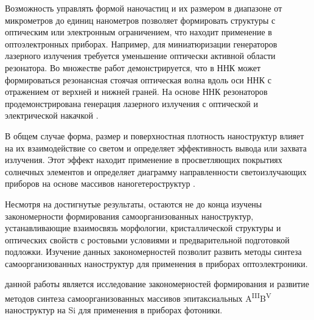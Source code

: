 Возможность управлять формой наночастиц и их размером в диапазоне от
микрометров до единиц нанометров позволяет формировать структуры с оптическим
или электронным ограничением, что находит применение в оптоэлектронных
приборах. Например, для миниатюризации генераторов лазерного излучения
требуется уменьшение оптически активной области резонатора. Во множестве работ
демонстрируется, что в ННК может формироваться резонансная стоячая оптическая
волна вдоль оси ННК с отражением от верхней и нижней граней. На основе ННК
резонаторов продемонстрирована генерация лазерного излучения с оптической и
электрической накачкой \cite{Eaton2016}.

В общем случае форма, размер и поверхностная плотность наноструктур влияет на
их взаимодействие со светом и определяет эффективность вывода или захвата
излучения. Этот эффект находит применение в просветляющих покрытиях солнечных
элементов \cite{Mozharov2015b, Krogman2005} и определяет диаграмму
направленности светоизлучающих приборов на основе массивов наногетероструктур
\cite{Eaton2016}.

Несмотря на достигнутые результаты, остаются не до конца изучены закономерности
формирования самоорганизованных наноструктур, устанавливающие взаимосвязь
морфологии, кристаллической структуры и оптических свойств с ростовыми
условиями и предварительной подготовкой подложки. Изучение данных
закономерностей позволит развить методы синтеза самоорганизованных наноструктур
для применения в приборах оптоэлектроники.



{\aim} данной работы является исследование закономерностей формирования и
развитие методов синтеза самоорганизованных массивов эпитаксиальных
A\textsuperscript{III}B\textsuperscript{V} наноструктур на Si для применения в
приборах фотоники.

